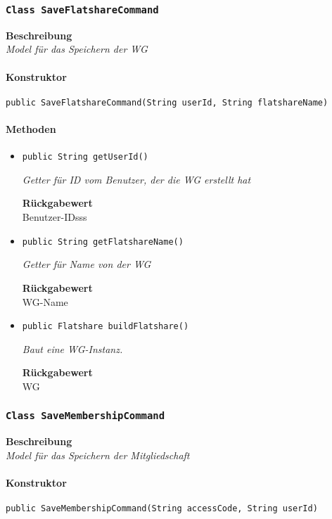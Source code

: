     \subsubsection{\texttt{Class SaveFlatshareCommand}}
    \textbf{Beschreibung} \\
    \textit{Model für das Speichern der WG}
    \paragraph*{Konstruktor}
    \texttt{public SaveFlatshareCommand(String userId, String flatshareName)}
    \paragraph*{Methoden}
    \begin{itemize}
    	\item{\texttt{public String getUserId()}}
    	
    	\textit{Getter für ID vom Benutzer, der die WG erstellt hat}
    	
    	
    	
    	\textbf{Rückgabewert} \\
    	Benutzer-IDsss        \item{\texttt{public String getFlatshareName()}}
    	
    	\textit{Getter für Name von der WG}
    	
    	
    	
    	\textbf{Rückgabewert} \\
    	WG-Name        \item{\texttt{public Flatshare buildFlatshare()}}
    	
    	\textit{Baut eine WG-Instanz.}
    	
    	
    	
    	\textbf{Rückgabewert} \\
    	WG
    \end{itemize}
    \subsubsection{\texttt{Class SaveMembershipCommand}}
    \textbf{Beschreibung} \\
    \textit{Model für das Speichern der Mitgliedschaft}
    \paragraph*{Konstruktor}
    \texttt{public SaveMembershipCommand(String accessCode, String userId)}
